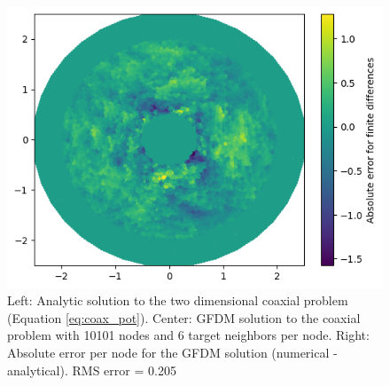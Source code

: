 \documentclass{PoS}
\begin{document}
\begin{figure}[hbt]
\begin{minipage}{0.32\linewidth}
\end{minipage}
\hfill
\begin{minipage}{0.32\linewidth}
    \centering
    \includegraphics[width=\linewidth]{Figures/GFDM/Coax_GFDM_Error.png}
\end{minipage}
\caption{Left: Analytic solution to the two dimensional coaxial problem (Equation \ref{eq:coax_pot}). Center: GFDM solution to the coaxial problem with 10101 nodes and 6 target neighbors per node. Right: Absolute error per node for the GFDM solution (numerical - analytical). RMS error = 0.205}
\label{fig:gfdm_coax_solutions}
\end{figure}
\end{document}
